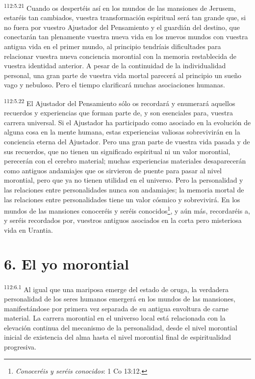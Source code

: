 \par
\textsuperscript{112:5.21} Cuando os despertéis así en los mundos de las mansiones de Jerusem, estaréis tan cambiados, vuestra transformación espiritual será tan grande que, si no fuera por vuestro Ajustador del Pensamiento y el guardián del destino, que conectarán tan plenamente vuestra nueva vida en los nuevos mundos con vuestra antigua vida en el primer mundo, al principio tendríais dificultades para relacionar vuestra nueva conciencia morontial con la memoria restablecida de vuestra identidad anterior. A pesar de la continuidad de la individualidad personal, una gran parte de vuestra vida mortal parecerá al principio un sueño vago y nebuloso. Pero el tiempo clarificará muchas asociaciones humanas.

\par
\textsuperscript{112:5.22} El Ajustador del Pensamiento sólo os recordará y enumerará aquellos recuerdos y experiencias que forman parte de, y son esenciales para, vuestra carrera universal. Si el Ajustador ha participado como asociado en la evolución de alguna cosa en la mente humana, estas experiencias valiosas sobrevivirán en la conciencia eterna del Ajustador. Pero una gran parte de vuestra vida pasada y de sus recuerdos, que no tienen un significado espiritual ni un valor morontial, perecerán con el cerebro material; muchas experiencias materiales desaparecerán como antiguos andamiajes que os sirvieron de puente para pasar al nivel morontial, pero que ya no tienen utilidad en el universo. Pero la personalidad y las relaciones entre personalidades nunca son andamiajes; la memoria mortal de las relaciones entre personalidades tiene un valor cósmico y sobrevivirá. En los mundos de las mansiones conoceréis y seréis conocidos\footnote{\textit{Conoceréis y seréis conocidos}: 1 Co 13:12.}, y aún más, recordaréis a, y seréis recordados por, vuestros antiguos asociados en la corta pero misteriosa vida en Urantia.

\section*{6. El yo morontial}
\par
\textsuperscript{112:6.1} Al igual que una mariposa emerge del estado de oruga, la verdadera personalidad de los seres humanos emergerá en los mundos de las mansiones, manifestándose por primera vez separada de su antigua envoltura de carne material. La carrera morontial en el universo local está relacionada con la elevación continua del mecanismo de la personalidad, desde el nivel morontial inicial de existencia del alma hasta el nivel morontial final de espiritualidad progresiva.

